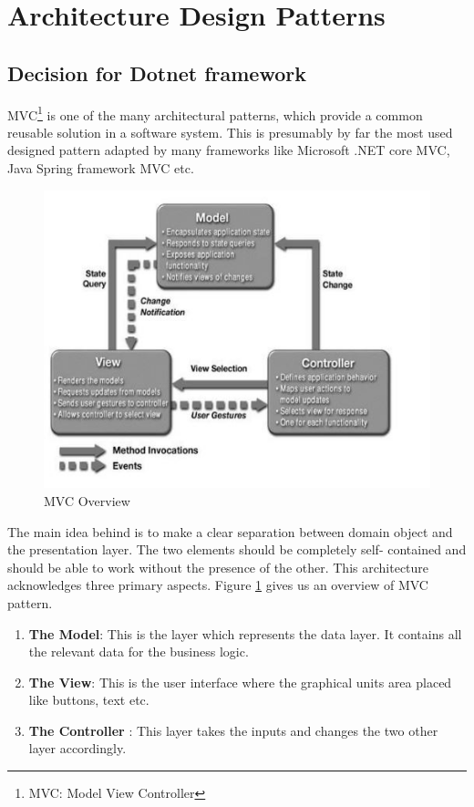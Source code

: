 \section{Architecture Design Patterns}

\subsection{Decision for Dotnet framework}
\label{ssec:dotnet}

MVC\footnote{MVC: Model View Controller} is one of the many architectural patterns, which provide a common reusable solution in a software system.
This is presumably by far the most used designed pattern adapted by many frameworks like
Microsoft .NET core MVC, 
Java Spring framework MVC etc. 

\begin{figure}[H]
    \centering \includegraphics{grafiken/mvc_hotop.jpg}
    \caption{MVC Overview \cite{Hotop2015}}
    \label{fig:mvcOverview}
\end{figure}

\par
   The main idea behind is to make a clear separation between domain object and the presentation layer. The two elements should be completely self-
   contained and should be able to work without the presence of the other. This 
   architecture acknowledges three primary aspects. Figure \ref{fig:mvcOverview} 
   gives us an overview of MVC pattern.
   \begin{enumerate}
       \item 
        \textbf{The Model}: This is the layer which represents the data layer. It 
        contains all the relevant data for the business logic.

       \item 
        \textbf{The View}: This is the user interface where the graphical units area
        placed like buttons, text etc.

       \item 
        \textbf{The Controller} : This layer takes the inputs and changes the two other
        layer accordingly.
   \end{enumerate} 